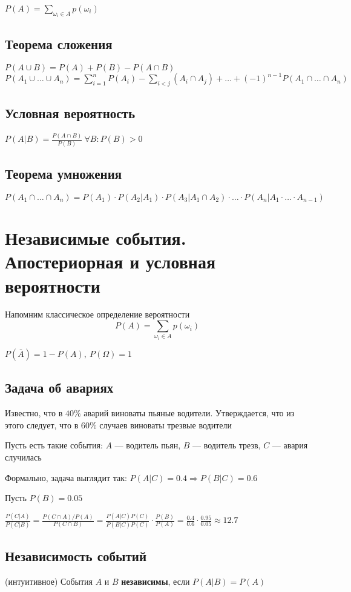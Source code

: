 \documentclass[a4paper, 10pt]{article}
\begin{document}
 $P(A)=\sum_{\omega_i\in A}p(\omega_i)$
\subsection{Теорема сложения}
\indent $P(A\cup B)=P(A)+P(B)-P(A\cap B)$\\[2mm]
\indent $P(A_1\cup\ldots\cup A_n)=\sum_{i=1}^{n} P(A_i)-\sum_{i<j} (A_i\cap A_j)+\ldots+(-1)^{n-1}P(A_1\cap\ldots\cap A_n)$
\subsection{Условная вероятность}
$P(A|B)=\displaystyle\frac{P(A\cap B)}{P(B)}\ \forall B: P(B)>0$
\subsection{Теорема умножения}
$P(A_1\cap\ldots\cap A_n)=P(A_1)\cdot P(A_2|A_1)\cdot P(A_3|A_1\cap A_2)\cdot\ldots\cdot P(A_n|A_1\cdot\ldots\cdot A_{n-1})$

\section{Независимые события. Апостериорная и условная вероятности}
Напомним классическое определение вероятности
$$P(A)=\sum_{\omega_i\in A}p(\omega_i)$$

\comment $P(\overline{A})=1-P(A),\ P(\Omega)=1$

\subsection{Задача об авариях}
Известно, что в $40\%$ аварий виноваты пьяные водители. Утверждается, что из этого следует, что в $60\%$ случаев виноваты трезвые водители

Пусть есть такие события: $A$ — водитель пьян, $B$ — водитель трезв, $C$ — авария случилась

Формально, задача выглядит так: $P(A|C)=0.4\Longrightarrow P(B|C)=0.6$

Пусть $P(B)=0.05$

$\displaystyle\frac{P(C|A)}{P(C|B)}=\frac{P(C\cap A)/P(A)}{P(C\cap B)}=\frac{P(A|C)P(C)}{P(B|C)P(C)}\cdot\frac{P(B)}{P(A)}=\frac{0.4}{0.6}\cdot\frac{0.95}{0.05}\approx 12.7$

\subsection{Независимость событий}
 (интуитивное) События  $A\text{ и }B$ \textbf{независимы}, если $P(A|B)=P(A)$
\end{document}
